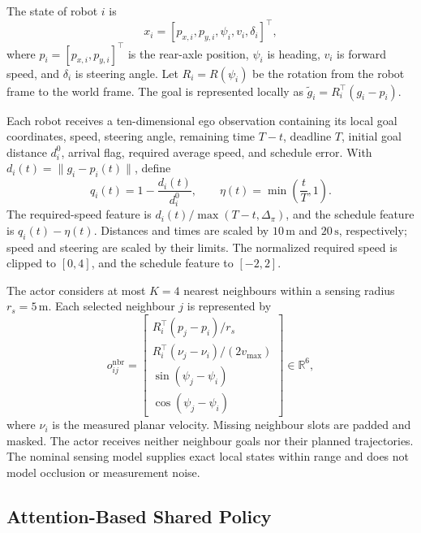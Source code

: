 The state of robot $i$ is
\begin{equation}
    x_i=[p_{x,i},p_{y,i},\psi_i,v_i,\delta_i]^\top,
\end{equation}
where $p_i=[p_{x,i},p_{y,i}]^\top$ is the rear-axle position, $\psi_i$ is
heading, $v_i$ is forward speed, and $\delta_i$ is steering angle. Let
$R_i=R(\psi_i)$ be the rotation from the robot frame to the world frame.
The goal is represented locally as $\widetilde g_i=R_i^\top(g_i-p_i)$.

Each robot receives a ten-dimensional ego observation containing its local
goal coordinates, speed, steering angle, remaining time $T-t$, deadline $T$,
initial goal distance $d_i^0$, arrival flag, required average speed, and
schedule error. With $d_i(t)=\|g_i-p_i(t)\|$, define
\begin{equation}
    q_i(t)=1-\frac{d_i(t)}{d_i^0},
    \qquad \eta(t)=\min\!\left(\frac{t}{T},1\right).
\end{equation}
The required-speed feature is
$d_i(t)/\max(T-t,\Delta_\pi)$, and the schedule feature is
$q_i(t)-\eta(t)$. Distances and times are scaled by $10\,\mathrm{m}$ and
$20\,\mathrm{s}$, respectively; speed and steering are scaled by their
limits. The normalized required speed is clipped to $[0,4]$, and the schedule
feature to $[-2,2]$.

The actor considers at most $K=4$ nearest neighbours within a sensing radius
$r_s=5\,\mathrm{m}$. Each selected neighbour $j$ is represented by
\begin{equation}
    o_{ij}^{\mathrm{nbr}}=
    \begin{bmatrix}
        R_i^\top(p_j-p_i)/r_s\\
        R_i^\top(\nu_j-\nu_i)/(2v_{\max})\\
        \sin(\psi_j-\psi_i)\\
        \cos(\psi_j-\psi_i)
    \end{bmatrix}\in\mathbb{R}^{6},
\end{equation}
where $\nu_i$ is the measured planar velocity. Missing neighbour slots are
padded and masked. The actor receives neither neighbour goals nor their
planned trajectories. The nominal sensing model supplies exact local states
within range and does not model occlusion or measurement noise.

\subsection{Attention-Based Shared Policy}

